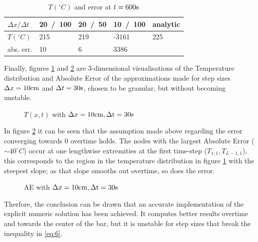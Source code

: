 \documentclass[a4paper]{article} %
\begin{document}
\begin{multicols}{2}
\begin{table}[H]
\centering
\small
\begin{tabular}{ |p{1.2cm}||p{1.2cm}|p{1.2cm}|p{1.2cm}|p{1.1cm}| }
 \hline
 \rowcolor{gray!50}
 $\Delta x / \Delta t$ & 20\ /\ 100 & 20\ /\ 50 & 10\ /\ 100 & analytic \\
 \hline 
 $T (^\circ C)$ & 215 & 219 & -3161 & 225 \\
 \hline
 abs. err. & 10 & 6 & 3386 & \\
 \hline
\end{tabular}
\caption{$T (^\circ C)$ and error at $t=600\rm{s}$}
\label{table:1}
\end{table}

Finally, figures \ref{fig:p1_3a}  and \ref{fig:p1_3b} are 3-dimensional visualisations of the Temperature distribution and Absolute Error of the approximations made for step sizes  $\Delta x = 10\rm{cm}$ and $\Delta t = 30\rm{s}$, chosen to be granular, but without becoming unstable. 
 
\begin{figure}[H]
    
    \caption{$T(x, t)$ with $\Delta x = 10\rm{cm}, \Delta t = 30\rm{s}$}
    \label{fig:p1_3a}
\end{figure}


In figure \ref{fig:p1_3b} it can be seen that the assumption made above regarding the error converging towards 0 overtime holds. The nodes with the largest Absolute Error ($\sim 40 ^\circ C$) occur at one lengthwise extremities at the first time-step ($T_{1,1}, T_{L-1,1}$), this corresponds to the region in the temperature distribution in figure \ref{fig:p1_3a} with the steepest slope; as that slope smooths out overtime, so does the error.

\begin{figure}[H]
    
    \caption{AE with $\Delta x = 10\rm{cm}, \Delta t = 30\rm{s}$}
    \label{fig:p1_3b}
\end{figure}

Therfore, the conclusion can be drawn that an accurate implementation of the explicit numeric solution has been achieved. It computes better results overtime and towards the center of the bar, but it is unstable for step sizes that break the inequality in \ref{eq:6}.

\end{multicols}
\end{document}
